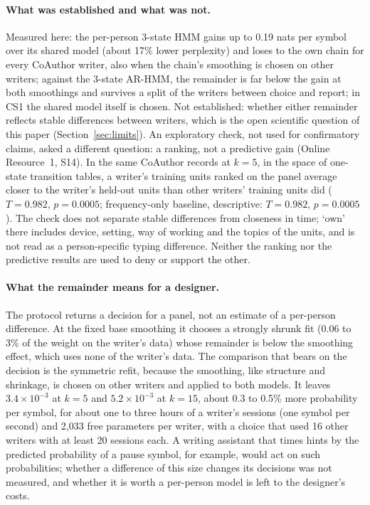 \documentclass[pdflatex,sn-basic]{sn-jnl}
\newcommand{\Sref}[1]{Online Resource~1, S#1}
\newcommand{\hmmthree}{\mbox{3-state} HMM}
\newcommand{\arthree}{\mbox{3-state} \mbox{AR-HMM}}
\begin{document}
\paragraph{What was established and what was not.} Measured here: the per-person \hmmthree{} gains up to 0.19 nats per symbol over its shared model (about 17\% lower perplexity) and loses to the own chain for every CoAuthor writer, also when the chain's smoothing is chosen on other writers; against the \arthree{}, the remainder is far below the gain at both smoothings and survives a split of the writers between choice and report; in CS1 the shared model itself is chosen. Not established: whether either remainder reflects stable differences between writers, which is the open scientific question of this paper (Section~\ref{sec:limits}). An exploratory check, not used for confirmatory claims, asked a different question: a ranking, not a predictive gain (\Sref{14}). In the same CoAuthor records at $k=5$, in the space of one-state transition tables, a writer's training units ranked on the panel average closer to the writer's held-out units than other writers' training units did ($T=0.982$, $p=0.0005$; frequency-only baseline, descriptive: $T=0.982$, $p=0.0005$). The check does not separate stable differences from closeness in time; `own' there includes device, setting, way of working and the topics of the units, and is not read as a person-specific typing difference. Neither the ranking nor the predictive results are used to deny or support the other.

\paragraph{What the remainder means for a designer.} The protocol returns a decision for a panel, not an estimate of a per-person difference. At the fixed base smoothing it chooses a strongly shrunk fit (0.06 to 3\% of the weight on the writer's data) whose remainder is below the smoothing effect, which uses none of the writer's data. The comparison that bears on the decision is the symmetric refit, because the smoothing, like structure and shrinkage, is chosen on other writers and applied to both models. It leaves $3.4\times10^{-3}$ at $k=5$ and $5.2\times10^{-3}$ at $k=15$, about 0.3 to 0.5\% more probability per symbol, for about one to three hours of a writer's sessions (one symbol per second) and 2,033 free parameters per writer, with a choice that used 16 other writers with at least 20 sessions each. A writing assistant that times hints by the predicted probability of a pause symbol, for example, would act on such probabilities; whether a difference of this size changes its decisions was not measured, and whether it is worth a per-person model is left to the designer's costs.
\end{document}
